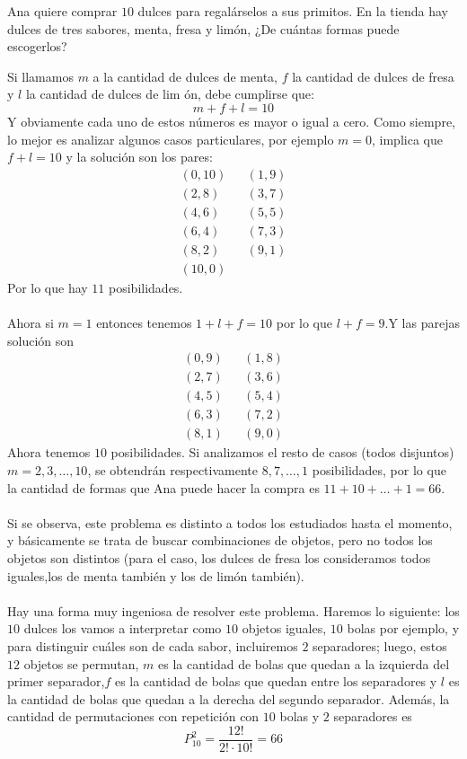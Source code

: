 \documentclass[12pt]{article}
\begin{document}
\begin{ejemplo}
Ana quiere comprar $10$ dulces para regalárselos a sus primitos. En la tienda hay dulces de tres sabores, menta, fresa y limón, ¿De cuántas formas puede escogerlos?
\end{ejemplo}
\begin{solucion}
Si llamamos $m$ a la cantidad de dulces de menta, $f$ la  cantidad  de dulces  de  fresa  y $l$ la  cantidad  de  dulces  de  lim ón,  debe  cumplirse que:
\[m+f+l=10\]
Y obviamente cada uno de estos números es mayor o igual a cero. Como siempre, lo mejor es analizar algunos casos particulares, por ejemplo $m=0$, implica que $f+l=10$ y la solución son los pares:
\begin{eqnarray*}
(0,10)&&(1,9)\\(2,8)&&(3,7)\\
(4,6)&&(5,5)\\ (6,4)&&(7,3)\\
(8,2)&&(9,1)\\ (10,0)
\end{eqnarray*}
Por lo que hay $11$ posibilidades.\\\\
Ahora si $m=1$ entonces tenemos $1+l+f=10$ por lo que $l+f=9$.Y las parejas solución son
\begin{eqnarray*}
(0,9)&&(1,8)\\(2,7)&&(3,6)\\
(4,5)&&(5,4)\\ (6,3)&&(7,2)\\
(8,1)&&(9,0)
\end{eqnarray*}
Ahora tenemos $10$ posibilidades. Si  analizamos  el  resto  de  casos (todos  disjuntos) $m=2,3,\ldots,10$,  se  obtendrán  respectivamente $8,7,\ldots,1$  posibilidades,  por  lo  que  la  cantidad  de  formas  que  Ana puede hacer la compra es $11+10+\ldots+1=66$.\\\\
Si se observa, este problema es distinto a todos los estudiados hasta el  momento,  y  básicamente  se  trata  de  buscar  combinaciones  de objetos, pero  no  todos  los  objetos  son  distintos  (para  el  caso,  los dulces de fresa los consideramos todos iguales,los de menta también y los de limón también).\\\\
Hay una forma muy ingeniosa de resolver este problema. Haremos lo siguiente: los $10$ dulces los vamos a interpretar como $10$ objetos iguales, $10$ bolas por ejemplo, y para  distinguir  cuáles son de cada sabor, incluiremos $2$ separadores; luego, estos $12$ objetos se permutan, $m$ es la cantidad de bolas que quedan a la izquierda del primer separador,$f$ es la cantidad de bolas que quedan entre los separadores y $l$ es la cantidad de bolas que quedan a la derecha del segundo separador. Además, la cantidad de permutaciones  con  repetición con $10$ bolas y $2$ separadores es
\[P^2_{10}=\frac{12!}{2!\cdot 10!}=66\]
\end{solucion}
\end{document}
